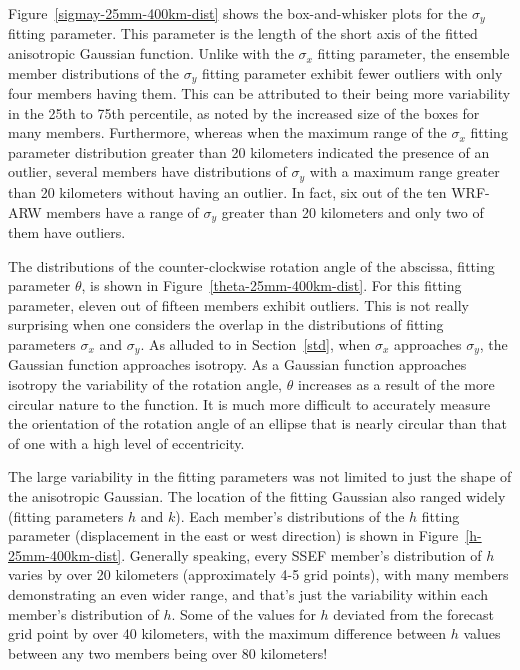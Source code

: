 \mbox{Figure \ref{sigmay-25mm-400km-dist}} shows the box-and-whisker plots for the $\sigma_y$ fitting parameter.
This parameter is the length of the short axis of the fitted anisotropic Gaussian function.
Unlike with the $\sigma_x$ fitting parameter, the ensemble member distributions of the $\sigma_y$ fitting parameter exhibit fewer outliers with only four members having them.
This can be attributed to their being more variability in the 25th to 75th percentile, as noted by the increased size of the boxes for many members.
Furthermore, whereas when the maximum range of the $\sigma_x$ fitting parameter distribution greater than 20 kilometers indicated the presence of an outlier, several members have distributions of $\sigma_y$ with a maximum range greater than 20 kilometers without having an outlier.
In fact, six out of the ten WRF-ARW members have a range of $\sigma_y$ greater than 20 kilometers and only two of them have outliers.


The distributions of the counter-clockwise rotation angle of the abscissa, fitting parameter $\theta$, is shown in \mbox{Figure \ref{theta-25mm-400km-dist}}.
For this fitting parameter, eleven out of fifteen members exhibit outliers.
This is not really surprising when one considers the overlap in the distributions of fitting parameters $\sigma_x$ and $\sigma_y$.
As alluded to in \mbox{Section \ref{std}}, when $\sigma_x$ approaches $\sigma_y$, the Gaussian function approaches isotropy.
As a Gaussian function approaches isotropy the variability of the rotation angle, $\theta$ increases as a result of the more circular nature to the function.
It is much more difficult to accurately measure the orientation of the rotation angle of an ellipse that is nearly circular than that of one with a high level of eccentricity.


The large variability in the fitting parameters was not limited to just the shape of the anisotropic Gaussian.
The location of the fitting Gaussian also ranged widely (fitting parameters $h$ and $k$).
Each member's distributions of the $h$ fitting parameter (displacement in the east or west direction) is shown in \mbox{Figure \ref{h-25mm-400km-dist}}.
Generally speaking, every SSEF member's distribution of $h$ varies by over 20 kilometers (approximately 4-5 grid points), with many members demonstrating an even wider range, and that's just the variability within each member's distribution of $h$.
Some of the values for $h$ deviated from the forecast grid point by over 40 kilometers, with the maximum difference between $h$ values between any two members being over 80 kilometers!


